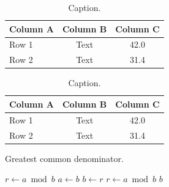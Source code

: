 \begin{table}[!ht]
  \small
  \centering
  \caption{Caption.}
  \label{tab:label}
  \begin{tabularx}{\textwidth}{X | c S[table-format=2.1]}
    \toprule
    \textbf{Column A} & \textbf{Column B} & {\textbf{Column C}} \\
    \midrule
    Row 1 & Text & 42.0 \\
    Row 2 & Text & 31.4 \\
    \bottomrule
  \end{tabularx}
\end{table}

\begin{table}[!ht]
  \small
  \centering
  \caption{Caption.}
  \label{tab:label2}
  \begin{tabular}{l | c S[table-format=2.1]}
    \toprule
    \textbf{Column A} & \textbf{Column B} & {\textbf{Column C}} \\
    \midrule
    Row 1 & Text & 42.0 \\
    Row 2 & Text & 31.4 \\
    \bottomrule
  \end{tabular}
\end{table}

\begin{algorithm}[!ht]
  \caption{Greatest common denominator.}
  \label{alg:label}
  \begin{algorithmic}[1]
   
    \State $r \gets a \bmod b$
     
      \State $a \gets b$
      \State $b \gets r$
      \State $r \gets a \bmod b$
    \EndWhile
    \State \Return $b$ 
  \EndProcedure
  \end{algorithmic}
\end{algorithm}
